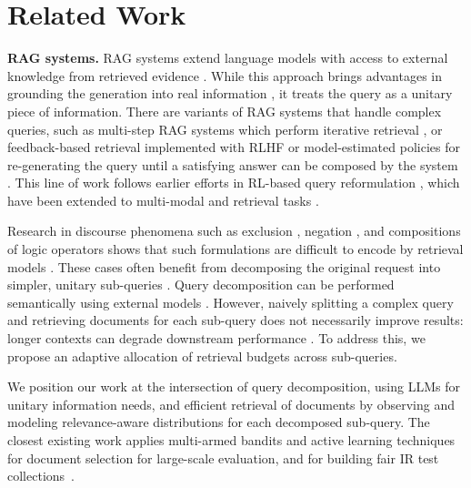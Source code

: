 \section{Related Work}

\textbf{RAG systems.}
RAG systems extend language models with access to external knowledge from retrieved evidence \cite{lewis2021retrievalaugmentedgenerationknowledgeintensivenlp, asai2020multipledocuments, soudani2024surveyrecentadvancesconversational}. While this approach brings advantages in grounding the generation into real information \cite{askari2025selfseedingmultiintentselfinstructingllms}, it treats the query as a unitary piece of information. There are variants of RAG systems that handle complex queries, such as multi-step RAG systems which perform iterative retrieval \cite{Gu2025ChainOfRetrieval}, or feedback-based retrieval implemented with RLHF or model-estimated policies for re-generating the query until a satisfying answer can be composed by the system \cite{deng2022rlpromptoptimizingdiscretetext, rafailov2024DPO, Jun2025SearchR1}. This line of work follows earlier efforts in RL-based query reformulation \cite{Buck2018ReformulationQuery}, which have been extended to multi-modal and retrieval tasks \cite{odijkMaarten}.

Research in discourse phenomena such as exclusion \cite{excluir}, negation \cite{nevir, petcu2025comprehensivetaxonomynegationnlp}, and compositions of logic operators \cite{Zhang2024BoolQuestionsDD} shows that such formulations are difficult to encode by retrieval models \cite{krasakis2025constructingsetcompositionalnegatedrepresentations}. These cases often benefit from decomposing the original request into simpler, unitary sub-queries \cite{yaoreasoningpaths}. Query decomposition can be performed semantically using external models \cite{khot2023decomposedpromptingmodularapproach}.
However, naively splitting a complex query and retrieving documents for each sub-query does not necessarily improve results: longer contexts can degrade downstream performance \cite{shao2025reasonirtrainingretrieversreasoning}. To address this, we propose an adaptive allocation of retrieval budgets across sub-queries. %


 We position our work at the intersection of query decomposition, using LLMs for unitary information needs, and efficient retrieval of documents by observing and modeling relevance-aware distributions for each decomposed sub-query. The closest existing work applies multi-armed bandits and active learning techniques for document selection for large-scale evaluation, and for building fair IR test collections~\cite{Li_2017, Rahman_2020, 10.1145/3269206.3271766}.